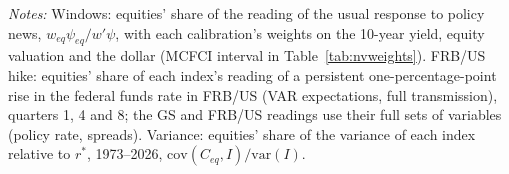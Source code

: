 \begin{table}[tbp]\centering\small
\caption{Equities in a Policy Move and in the History of Each Index}\label{tab:nvequity}
\begin{flushleft}\footnotesize\textit{Notes:} Windows: equities' share of the reading of the usual response to policy news, $w_{eq}\psi_{eq}/w'\psi$, with each calibration's weights on the 10-year yield, equity valuation and the dollar (MCFCI interval in Table~\ref{tab:nvweights}). FRB/US hike: equities' share of each index's reading of a persistent one-percentage-point rise in the federal funds rate in FRB/US (VAR expectations, full transmission), quarters 1, 4 and 8; the GS and FRB/US readings use their full sets of variables (policy rate, spreads). Variance: equities' share of the variance of each index relative to $r^*$, 1973--2026, $\mathrm{cov}(C_{eq},I)/\mathrm{var}(I)$.\end{flushleft}
\end{table}
